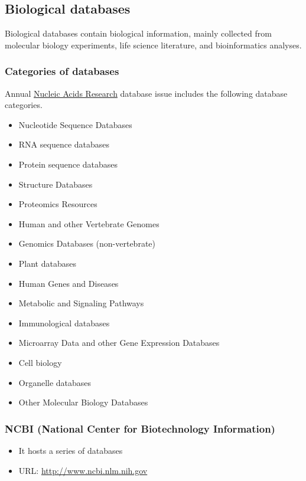 %
%

%
%
\subsection{Biological databases}
Biological databases contain biological information, mainly collected from molecular biology experiments, life science literature, and bioinformatics analyses.

%
%
\subsubsection*{Categories of databases} 
Annual \href{http://nar.oxfordjournals.org}{Nucleic Acids Research} database issue includes the following database categories.

\begin{itemize}
\item Nucleotide Sequence Databases
\item RNA sequence databases
\item Protein sequence databases
\item Structure Databases
\item Proteomics Resources
\item Human and other Vertebrate Genomes
\item Genomics Databases (non-vertebrate)
\item Plant databases
\item Human Genes and Diseases
\item Metabolic and Signaling Pathways
\item Immunological databases
\item Microarray Data and other Gene Expression Databases
\item Cell biology
\item Organelle databases
\item Other Molecular Biology Databases
\end{itemize}

%
%
\subsubsection*{NCBI (National Center for Biotechnology Information)} 
\begin{itemize}
\item It hosts a series of databases
\item URL: \href{http://www.ncbi.nlm.nih.gov}{http://www.ncbi.nlm.nih.gov}
\end{itemize}

